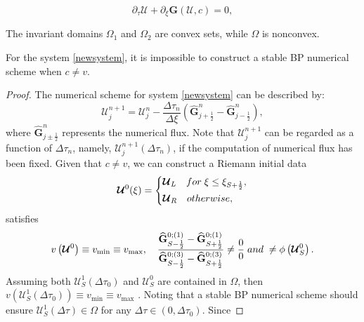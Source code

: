 \documentclass[10pt,a4paper]{amsart}
\begin{document}
\begin{equation}\label{newsystem}
    \partial_\tau \boldsymbol{\mathcal{U}} + \partial_\xi \mathbf{G}(\boldsymbol{\mathcal{U}}, c) = 0,
\end{equation}

\begin{lemma}
\label{778}
	The invariant domains $\Omega_1$ and $\Omega_2$ are convex sets, while $\Omega$ is nonconvex.
\end{lemma}

\begin{theorem}
\label{infeasible}
	For the system \eqref{newsystem}, it is impossible to construct a stable BP numerical scheme when $c \neq v$.
\end{theorem}

\begin{proof}
	The numerical scheme for system \eqref{newsystem} can be described by:
	\begin{equation*}
		\boldsymbol{\mathcal{U}}_j^{n + 1} = \boldsymbol{\mathcal{U}}_j^n - \frac{\Delta \tau_n}{\Delta \xi} \left( \widehat{\mathbf{G}}_{j + \frac{1}{2}}^n - \widehat{\mathbf{G}}_{j - \frac{1}{2}}^n \right),
	\end{equation*}
	where $\widehat{\mathbf{G}}_{j \pm \frac{1}{2}}^n$ represents the numerical flux. Note that $\boldsymbol{\mathcal{U}}_j^{n + 1}$ can be regarded as a function of $\Delta \tau_n$, namely, $\boldsymbol{\mathcal{U}}_j^{n + 1} (\Delta \tau_n)$, if the computation of numerical flux has been fixed. Given that $c \neq v$, we can construct a Riemann initial data
	\begin{equation*}
		\boldsymbol{\mathcal{U}}^0 (\xi) = \left\{
		\begin{aligned}
			& \boldsymbol{\mathcal{U}}_L \quad {\rm for} \; \xi \leq \xi_{S + \frac{1}{2}}, \\
			& \boldsymbol{\mathcal{U}}_R \quad {\rm otherwise},
		\end{aligned}
		\right.
	\end{equation*}
	satisfies
	\begin{equation}
	\label{90}
		v \left(\boldsymbol{\mathcal{U}}^0 \right) \equiv v_{\min} \equiv v_{\max}, \quad \frac{\widehat{\mathbf{G}}_{S - \frac{1}{2}}^{0;(1)} - \widehat{\mathbf{G}}_{S + \frac{1}{2}}^{0;(1)}}{\widehat{\mathbf{G}}_{S - \frac{1}{2}}^{0;(3)} - \widehat{\mathbf{G}}_{S + \frac{1}{2}}^{0;(3)}} \neq \frac{0}{0} \; {\rm and} \; \neq \phi \left( \boldsymbol{\mathcal{U}}_S^{0} \right). 
	\end{equation}
	Assuming both $\boldsymbol{\mathcal{U}}_S^{1}(\Delta \tau_0)$ and $\boldsymbol{\mathcal{U}}_S^{0}$ are contained in $\Omega$, then $v \left(\boldsymbol{\mathcal{U}}_S^{1}(\Delta \tau_0) \right) \equiv v_{\min} \equiv v_{\max}$ . Noting that a stable BP numerical scheme should ensure $\boldsymbol{\mathcal{U}}_S^{1}(\Delta \tau) \in \Omega$ for any $\Delta \tau \in (0, \Delta \tau_0)$. Since

\end{proof}
\end{document}
